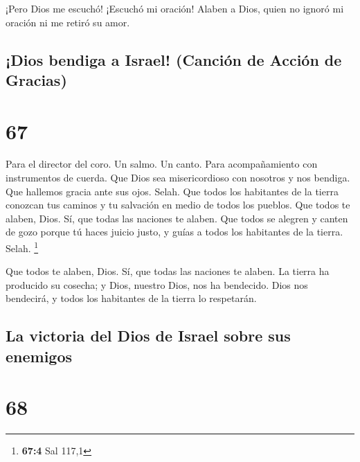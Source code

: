  ¡Pero Dios me escuchó! ¡Escuchó mi oración! 
Alaben a Dios, quien no ignoró mi oración ni me retiró su amor.

\hypertarget{dios-bendiga-a-israel-canciuxf3n-de-acciuxf3n-de-gracias}{%
\subsection{¡Dios bendiga a Israel! (Canción de Acción de
Gracias)}\label{dios-bendiga-a-israel-canciuxf3n-de-acciuxf3n-de-gracias}}

\hypertarget{section-66}{%
\section{67}\label{section-66}}

Para el director del coro. Un salmo. Un canto. Para acompañamiento con
instrumentos de cuerda.  Que Dios sea misericordioso con
nosotros y nos bendiga. Que hallemos gracia ante sus ojos. Selah.
 Que todos los habitantes de la tierra conozcan tus caminos
y tu salvación en medio de todos los pueblos.  Que todos te
alaben, Dios. Sí, que todas las naciones te alaben.  Que
todos se alegren y canten de gozo porque tú haces juicio justo, y guías
a todos los habitantes de la tierra. Selah. \footnote{\textbf{67:4} Sal
  117,1}

 Que todos te alaben, Dios. Sí, que todas las naciones te
alaben.  La tierra ha producido su cosecha; y Dios, nuestro
Dios, nos ha bendecido.  Dios nos bendecirá, y todos los
habitantes de la tierra lo respetarán.

\hypertarget{la-victoria-del-dios-de-israel-sobre-sus-enemigos}{%
\subsection{La victoria del Dios de Israel sobre sus
enemigos}\label{la-victoria-del-dios-de-israel-sobre-sus-enemigos}}

\hypertarget{section-67}{%
\section{68}\label{section-67}}


